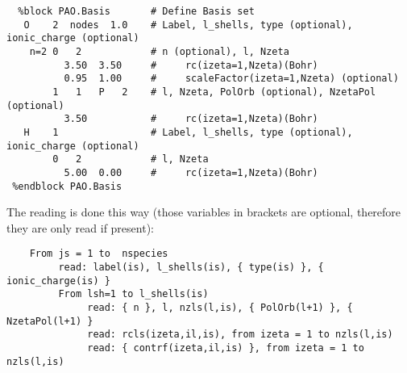 \begin{description}
\begin{verbatim}
  %block PAO.Basis       # Define Basis set
   O    2  nodes  1.0    # Label, l_shells, type (optional), ionic_charge (optional)
    n=2 0   2            # n (optional), l, Nzeta
          3.50  3.50     #     rc(izeta=1,Nzeta)(Bohr)
          0.95  1.00     #     scaleFactor(izeta=1,Nzeta) (optional)
        1   1   P   2    # l, Nzeta, PolOrb (optional), NzetaPol (optional)
          3.50           #     rc(izeta=1,Nzeta)(Bohr)
   H    1                # Label, l_shells, type (optional), ionic_charge (optional)
        0   2            # l, Nzeta
          5.00  0.00     #     rc(izeta=1,Nzeta)(Bohr)
 %endblock PAO.Basis
\end{verbatim}


\noindent
The reading is done this way (those variables in brackets are optional, 
therefore they are only read if
present):

\begin{verbatim}
    From js = 1 to  nspecies 
         read: label(is), l_shells(is), { type(is) }, { ionic_charge(is) }
         From lsh=1 to l_shells(is)
              read: { n }, l, nzls(l,is), { PolOrb(l+1) }, { NzetaPol(l+1) }
              read: rcls(izeta,il,is), from izeta = 1 to nzls(l,is)
              read: { contrf(izeta,il,is) }, from izeta = 1 to nzls(l,is)
\end{verbatim}





\end{description}
